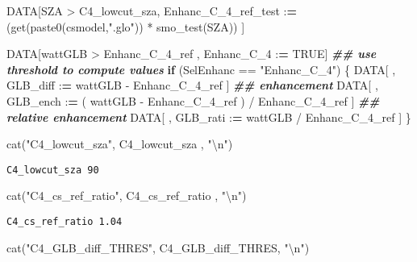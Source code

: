 \documentclass[
  10pt,
  a4paper,oneside]{article}
\newenvironment{Shaded}{\begin{snugshade}}{\end{snugshade}}
\newcommand{\ConstantTok}[1]{\textcolor[rgb]{0.00,0.00,0.00}{#1}}
\newcommand{\ControlFlowTok}[1]{\textcolor[rgb]{0.13,0.29,0.53}{\textbf{#1}}}
\newcommand{\DocumentationTok}[1]{\textcolor[rgb]{0.56,0.35,0.01}{\textbf{\textit{#1}}}}
\newcommand{\ErrorTok}[1]{\textcolor[rgb]{0.64,0.00,0.00}{\textbf{#1}}}
\newcommand{\FunctionTok}[1]{\textcolor[rgb]{0.00,0.00,0.00}{#1}}
\newcommand{\NormalTok}[1]{#1}
\newcommand{\SpecialCharTok}[1]{\textcolor[rgb]{0.00,0.00,0.00}{#1}}
\newcommand{\StringTok}[1]{\textcolor[rgb]{0.31,0.60,0.02}{#1}}
\begin{document}
\begin{Shaded}
\begin{Highlighting}[]
\NormalTok{DATA[SZA }\SpecialCharTok{\textgreater{}}\NormalTok{ C4\_lowcut\_sza,}
\NormalTok{     Enhanc\_C\_4\_ref\_test }\SpecialCharTok{:}\ErrorTok{=}\NormalTok{                                    (}\FunctionTok{get}\NormalTok{(}\FunctionTok{paste0}\NormalTok{(csmodel,}\StringTok{".glo"}\NormalTok{)) }\SpecialCharTok{*} \FunctionTok{smo\_test}\NormalTok{(SZA)) ]}



\NormalTok{DATA[wattGLB }\SpecialCharTok{\textgreater{}}\NormalTok{ Enhanc\_C\_4\_ref ,}
\NormalTok{     Enhanc\_C\_4 }\SpecialCharTok{:}\ErrorTok{=} \ConstantTok{TRUE}\NormalTok{]}
\DocumentationTok{\#\# use threshold to compute values}
\ControlFlowTok{if}\NormalTok{ (SelEnhanc }\SpecialCharTok{==} \StringTok{"Enhanc\_C\_4"}\NormalTok{) \{}
\NormalTok{  DATA[ , GLB\_diff }\SpecialCharTok{:}\ErrorTok{=}\NormalTok{   wattGLB }\SpecialCharTok{{-}}\NormalTok{ Enhanc\_C\_4\_ref                    ] }\DocumentationTok{\#\# enhancement}
\NormalTok{  DATA[ , GLB\_ench }\SpecialCharTok{:}\ErrorTok{=}\NormalTok{ ( wattGLB }\SpecialCharTok{{-}}\NormalTok{ Enhanc\_C\_4\_ref ) }\SpecialCharTok{/}\NormalTok{ Enhanc\_C\_4\_ref ] }\DocumentationTok{\#\# relative enhancement}
\NormalTok{  DATA[ , GLB\_rati }\SpecialCharTok{:}\ErrorTok{=}\NormalTok{   wattGLB }\SpecialCharTok{/}\NormalTok{ Enhanc\_C\_4\_ref                    ]}
\NormalTok{\}}

\FunctionTok{cat}\NormalTok{(}\StringTok{"C4\_lowcut\_sza"}\NormalTok{,      C4\_lowcut\_sza    , }\StringTok{"}\SpecialCharTok{\textbackslash{}n}\StringTok{"}\NormalTok{)}
\end{Highlighting}
\end{Shaded}

\begin{verbatim}
C4_lowcut_sza 90 
\end{verbatim}

\begin{Shaded}
\begin{Highlighting}[]
\FunctionTok{cat}\NormalTok{(}\StringTok{"C4\_cs\_ref\_ratio"}\NormalTok{,    C4\_cs\_ref\_ratio  , }\StringTok{"}\SpecialCharTok{\textbackslash{}n}\StringTok{"}\NormalTok{)}
\end{Highlighting}
\end{Shaded}

\begin{verbatim}
C4_cs_ref_ratio 1.04 
\end{verbatim}

\begin{Shaded}
\begin{Highlighting}[]
\FunctionTok{cat}\NormalTok{(}\StringTok{"C4\_GLB\_diff\_THRES"}\NormalTok{,  C4\_GLB\_diff\_THRES, }\StringTok{"}\SpecialCharTok{\textbackslash{}n}\StringTok{"}\NormalTok{)}
\end{Highlighting}
\end{Shaded}
\end{document}
